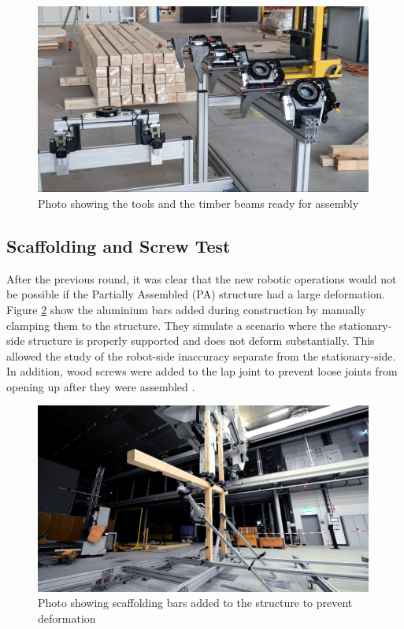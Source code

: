 \begin{figure}[!h]
    \centering
    \includegraphics[width=0.99\textwidth]{images/6b/img03.jpg}
    \caption{Photo showing the tools and the timber beams ready for assembly}
    \label{fig:tools-and-timber-beams}
\end{figure}


\subsection{Scaffolding and Screw Test}
\label{subsection:exploration-3-scaffolding-and-screw-test}

After the previous round, it was clear that the new robotic operations would not be possible if the Partially Assembled (PA) structure had a large deformation. Figure \ref{fig:scaffolding-bars} show the aluminium bars added during construction by manually clamping them to the structure. They simulate a scenario where the stationary-side structure is properly supported and does not deform substantially. This allowed the study of the robot-side inaccuracy separate from the stationary-side. In addition, wood screws were added to the lap joint to prevent loose joints from opening up after they were assembled .

\begin{figure}[!h]
    \centering
    \includegraphics[width=0.99\textwidth]{images/6b/img04.png}
    \caption{Photo showing scaffolding bars added to the structure to prevent deformation}
    \label{fig:scaffolding-bars}
\end{figure}

